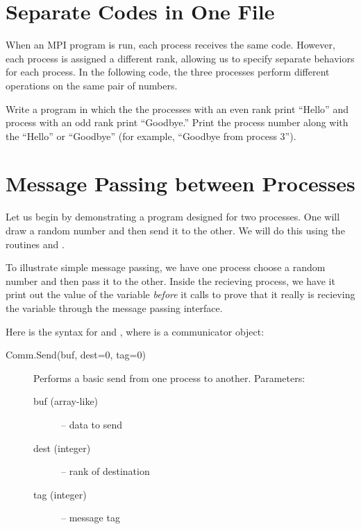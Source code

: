 \section*{Separate Codes in One File}
When an MPI program is run, each process receives the same code. 
However, each process is assigned a different rank, allowing us to specify separate 
behaviors for each process. In the following code, the three processes perform different operations on the same pair of numbers.


\begin{problem}
Write a program in which the the processes with an even rank print ``Hello'' and 
process with an odd rank print ``Goodbye.'' 
Print the process number along with the ``Hello'' or ``Goodbye'' 
(for example, ``Goodbye from process 3'').
\end{problem}

\section*{Message Passing between Processes}
Let us begin by demonstrating a program designed for two processes. One will draw a random number and then send it to the other. We will do this using the routines  and .



To illustrate simple message passing, we have one process choose a random number and then pass it to the other. Inside the recieving process, we have it print out the value of the variable  \emph{before} it calls  to prove that it really is recieving the variable through the message passing interface.

Here is the syntax for  and , where  is a communicator object:

\begin{description}
\item[Comm.Send(buf, dest=0, tag=0)]
Performs a basic send from one process to another.
Parameters:
\begin{description}
\item[buf (array-like)] – data to send
\item[dest (integer)] – rank of destination
\item[tag (integer)] – message tag
\end{description}
\end{description}


